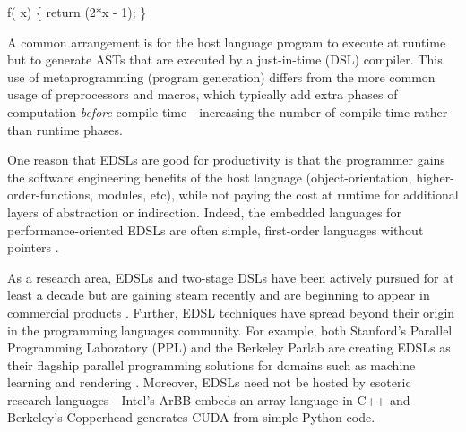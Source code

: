 \vspace{1mm}
\begin{code}
   f( x) \{
    return (2*x - 1);
  \}
\end{code}

A common arrangement is for the host language program to execute at
runtime but to generate ASTs that are executed by a just-in-time
(DSL) compiler.  This use of metaprogramming (program generation)
differs from the more common usage of preprocessors and 
macros, which typically add extra
phases of computation {\em before}  compile time---increasing
the number of compile-time rather than runtime phases.



One reason that EDSLs are good for productivity is that the programmer
gains the software engineering benefits of the host language
(object-orientation, higher-order-functions, modules, etc), while not
paying the cost at runtime for additional layers of abstraction or
indirection.  Indeed, the embedded languages for 
performance-oriented EDSLs are often simple, first-order
languages without pointers \cite{wavescript, Accelerate}.


As a research area, EDSLs and two-stage DSLs have been actively pursued for at least a
decade \cite{vertigo, wavescript} but are gaining steam
recently 
\cite{copperhead, stanford-ppl} 
and are beginning to appear in
commercial products \cite{ArBB}.
%
Further, EDSL techniques have spread beyond their origin in 
 the programming languages community.
% 
For example, both Stanford's Parallel Programming Laboratory (PPL) and
the Berkeley Parlab are creating EDSLs as their flagship parallel
programming solutions for domains such as machine learning and
rendering \cite{stanford-ppl}.
  Moreover, EDSLs need not be hosted by esoteric research languages---Intel's
 ArBB embeds an array language in C++ and Berkeley's
Copperhead \cite{copperhead} generates CUDA from simple Python code.


